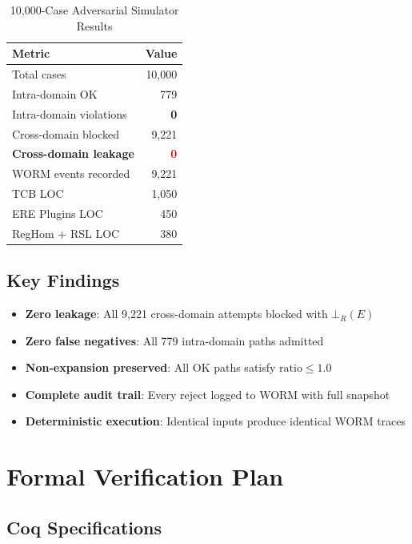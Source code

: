 \documentclass[11pt,a4paper]{article}
\begin{document}
\begin{table}[h]
\centering
\caption{10,000-Case Adversarial Simulator Results}
\label{tab:simulator_results}
\begin{tabular}{@{}lr@{}}
\toprule
\textbf{Metric} & \textbf{Value} \\
\midrule
Total cases & 10,000 \\
Intra-domain OK & 779 \\
Intra-domain violations & \textbf{0} \\
Cross-domain blocked & 9,221 \\
\textbf{Cross-domain leakage} & \textbf{\textcolor{red}{0}} \\
WORM events recorded & 9,221 \\
TCB LOC & 1,050 \\
ERE Plugins LOC & 450 \\
RegHom + RSL LOC & 380 \\
\bottomrule
\end{tabular}
\end{table}

\subsection{Key Findings}

\begin{itemize}
    \item \textbf{Zero leakage}: All 9,221 cross-domain attempts blocked with $\bot_R(E)$
    \item \textbf{Zero false negatives}: All 779 intra-domain paths admitted
    \item \textbf{Non-expansion preserved}: All OK paths satisfy $\text{ratio} \leq 1.0$
    \item \textbf{Complete audit trail}: Every reject logged to WORM with full snapshot
    \item \textbf{Deterministic execution}: Identical inputs produce identical WORM traces
\end{itemize}

\section{Formal Verification Plan}

\subsection{Coq Specifications}
\end{document}
